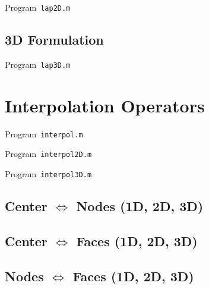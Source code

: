 \begin{listing}[ht!]
	\tiny
	\centering
	\caption{Program~\texttt{lap2D.m}}
	\label{code:lap2D.m}
\end{listing}

\subsection{3D Formulation}

\begin{listing}[ht!]
	\tiny
	\centering
	\caption{Program~\texttt{lap3D.m}}
	\label{code:lap3D.m}
\end{listing}

\section{Interpolation Operators}

\begin{listing}[ht!]
	\tiny
	\centering
	\caption{Program~\texttt{interpol.m}}
	\label{code:interpol.m}
\end{listing}

\begin{listing}[ht!]
	\tiny
	\centering
	\caption{Program~\texttt{interpol2D.m}}
	\label{code:interpol2D.m}
\end{listing}

\begin{listing}[ht!]
	\tiny
	\centering
	\caption{Program~\texttt{interpol3D.m}}
	\label{code:interpol3D.m}
\end{listing}

\subsection{Center $\Longleftrightarrow$ Nodes (1D, 2D, 3D)}
\subsection{Center $\Longleftrightarrow$ Faces (1D, 2D, 3D)}
\subsection{Nodes $\Longleftrightarrow$ Faces (1D, 2D, 3D)}

